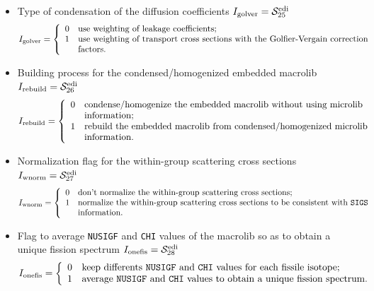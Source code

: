 \begin{itemize}
\item Type of condensation of the diffusion coefficients $I_{\rm golver}=\mathcal{S}^{\rm edi}_{25}$
\begin{displaymath}
I_{\rm golver} = \left\{
\begin{array}{ll}
0 & \textrm{use weighting of leakage coefficients;} \\
1 & \textrm{use weighting of transport cross sections with the Golfier-Vergain correction} \\
 & \textrm{factors.} \\
\end{array} \right.
\end{displaymath}
\item Building process for the condensed/homogenized embedded macrolib $I_{\rm rebuild}=\mathcal{S}^{\rm edi}_{26}$
\begin{displaymath}
I_{\rm rebuild} = \left\{
\begin{array}{ll}
0 & \textrm{condense/homogenize the embedded macrolib without using microlib} \\
 & \textrm{information;} \\
1 & \textrm{rebuild the embedded macrolib from condensed/homogenized microlib} \\
 & \textrm{information.} \\
\end{array} \right.
\end{displaymath}
\item Normalization flag for the within-group scattering cross sections $I_{\rm wnorm}=\mathcal{S}^{\rm edi}_{27}$
\begin{displaymath}
I_{\rm wnorm} = \left\{
\begin{array}{ll}
0 & \textrm{don't normalize the within-group scattering cross sections;} \\
1 & \textrm{normalize the within-group scattering cross sections to be consistent with {\tt SIGS}} \\
 & \textrm{information.} \\
\end{array} \right.
\end{displaymath}
\item Flag to average {\tt NUSIGF} and {\tt CHI} values of the macrolib so as to obtain a unique fission spectrum $I_{\rm onefis}=\mathcal{S}^{\rm edi}_{28}$
\begin{displaymath}
I_{\rm onefis} = \left\{
\begin{array}{ll}
0 & \textrm{keep differents {\tt NUSIGF} and {\tt CHI} values for each fissile isotope;} \\
1 & \textrm{average {\tt NUSIGF} and {\tt CHI} values to obtain a unique fission spectrum.} \\
\end{array} \right.
\end{displaymath}

\end{itemize}


